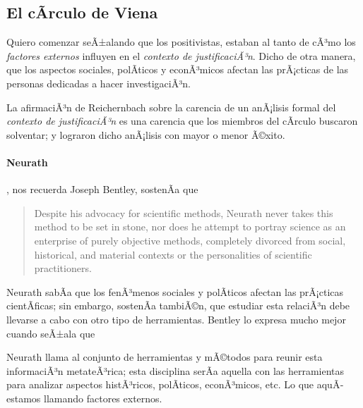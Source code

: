 \subsection{El cÃ­rculo de Viena}

\noindent Quiero comenzar seÃ±alando que los positivistas, 
estaban al tanto de cÃ³mo los \emph{factores externos} influyen en el \emph{contexto de justificaciÃ³n}.
Dicho de otra manera, que los aspectos sociales, polÃ­ticos y econÃ³micos afectan las prÃ¡cticas de las personas dedicadas a hacer investigaciÃ³n.

La afirmaciÃ³n de Reichernbach sobre la carencia de un anÃ¡lisis formal del \emph{contexto de justificaciÃ³n} es una carencia que los miembros del cÃ­rculo buscaron solventar; y lograron dicho anÃ¡lisis con mayor o menor Ã©xito.

\paragraph{Neurath}, nos recuerda Joseph Bentley, sostenÃ­a que

\begin{quote}
	Despite his advocacy for scientific methods, Neurath never takes this method to be set in stone, nor does he attempt to portray science as an enterprise of purely objective methods, completely divorced from social, historical, and material contexts or the personalities of scientific practitioners. \parencite[p.~41]{Bentley2023}
\end{quote}

Neurath sabÃ­a que los fenÃ³menos sociales y polÃ­ticos afectan las prÃ¡cticas cientÃ­ficas; sin embargo, sostenÃ­a tambiÃ©n, que estudiar esta relaciÃ³n debe llevarse a cabo con otro tipo de herramientas.
Bentley lo expresa mucho mejor cuando seÃ±ala que  \parencite[p.~62]{Bentley2023}

Neurath llama  al conjunto de herramientas y mÃ©todos para reunir esta informaciÃ³n metateÃ³rica; 
esta disciplina serÃ­a aquella con las herramientas para analizar aspectos histÃ³ricos, polÃ­ticos, econÃ³micos, etc.
Lo que aquÃ­ estamos llamando factores externos.

